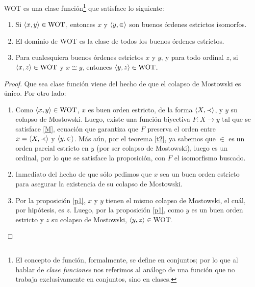 \begin{prop}\label{p2}
WOT es una clase función\footnote{El concepto de función, formalmente, se define en conjuntos; por lo que al hablar de \textit{clase funciones} nos referimos al análogo de una función que no trabaja exclusivamente en conjuntos, sino en clases.} que satisface lo siguiente:
\begin{enumerate}
    \item Si $\langle x,y\rangle\in\text{WOT}$, entonces $x$ y $\langle y,\in\rangle$ son buenos órdenes estrictos isomorfos. 
    \item El dominio de WOT es la clase de todos los buenos órdenes estrictos.
    \item Para cualesquiera buenos órdenes estrictos $x$ y $y$, y para todo ordinal $z$, si $\langle x,z\rangle\in\text{WOT}$ y $x\cong y$, entonces $\langle y,z\rangle\in\text{WOT}$.
\end{enumerate}
\end{prop}
\begin{proof} Que sea clase función viene del hecho de que el colapso de Mostowski es único. Por otro lado:
    \begin{enumerate}
        \item Como $\langle x,y\rangle\in\text{WOT}$, $x$ es buen orden estricto, de la forma $\langle X,\prec\rangle$, y $y$ su colapso de Mostowski. Luego, existe una función biyectiva $F:X\longrightarrow y$ tal que se satisface {\eqref{M}}, ecuación que garantiza que $F$ preserva el orden entre $x=\langle X,\prec\rangle$ y $\langle y,\in\rangle$. Más aún, por el teorema {\ref{t2}}, ya sabemos que $\in$ es un orden parcial estricto en $y$ (por ser colapso de Mostowski), luego es un ordinal, por lo que se satisface la proposición, con $F$ el isomorfismo buscado.
        \item Inmediato del hecho de que sólo pedimos que $x$ sea un buen orden estricto para asegurar la existencia de su colapso de Mostowski.
        \item Por la proposición {\ref{p1}}, $x$ y $y$ tienen el mismo colapso de Mostowski, el cuál, por hipótesis, es $z$. Luego, por la proposición {\ref{p1}}, como $y$ es un buen orden estricto y $z$ su colapso de Mostowski, $\langle y,z\rangle\in\text{WOT}$.
    \end{enumerate}
\end{proof}

